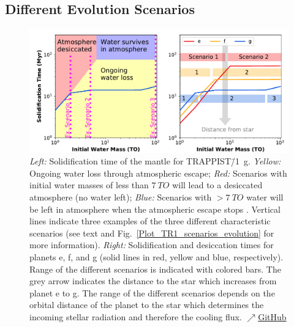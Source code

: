 \documentclass[oneside,twocolumn]{article}
\begin{document}
\subsection{Different Evolution Scenarios}

\begin{figure}[ht]
    \centering
    \includegraphics[width=\textwidth]{BarthFig5.pdf}
    \caption{\textit{Left:} Solidification time of the mantle for TRAPPIST\=/1~g. \textit{Yellow:} Ongoing water loss through atmospheric escape; \textit{Red:} Scenarios with initial water masses of less than $\SI{7}{TO}$ will lead to a desiccated atmosphere (no water left); \textit{Blue:} Scenarios with $>\SI{7}{TO}$ water will be left in atmosphere when the atmospheric escape stops \citep{Kopparapu2013}. Vertical lines indicate three examples of the three different characteristic scenarios (see text and Fig.~\ref{Plot_TR1_scenarios_evolution} for more information). \textit{Right:} Solidification and desiccation times for planets e, f, and g (solid lines in red, yellow and blue, respectively). Range of the different scenarios is indicated with colored bars. The grey arrow indicates the distance to the star which increases from planet e to g. The range of the different scenarios depends on the orbital distance of the planet to the star which determines the incoming stellar radiation and therefore the cooling flux.
    \href{https://github.com/pbfeu/Trappist1_MagmOc/tree/public/Fig_Trappist1g_scenarios}{$\nearrow$GitHub}
    }
    \label{Summary_Trappist1_scenarios_g}
\end{figure}
\end{document}
